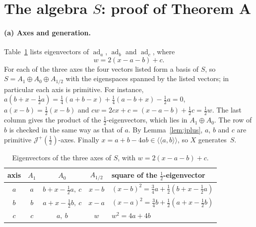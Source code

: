 \documentclass[11pt]{article}
\theoremstyle{definition}
\theoremstyle{remark}
\newcommand{\cJ}{\mathcal J}
\newcommand{\Jp}{\cJ^{+}}
\newcommand{\lla}{\langle\!\langle}
\newcommand{\rra}{\rangle\!\rangle}
\newcommand{\ad}{\operatorname{ad}}
\newcommand{\half}{\tfrac12}
\begin{document}
\section{The algebra \texorpdfstring{$S$}{S}: proof of Theorem A}\label{sec:S}

\paragraph{(a) Axes and generation.}
Table~\ref{tab:eig} lists eigenvectors of $\ad_a$, $\ad_b$ and $\ad_c$, where
\[
w=2(x-a-b)+c .
\]
For each of the three axes the four vectors listed form a basis of $S$, so
$S=A_1\oplus A_0\oplus A_{1/2}$ with the eigenspaces spanned by the listed
vectors; in particular each axis is primitive. For instance,
$a(b+x-\half a)=\frac14(a+b-x)+\frac14(a-b+x)-\half a=0$,
$a(x-b)=\half(x-b)$ and $cw=2cx+c=(x-a-b)+\half c=\half w$. The last column
gives the product of the $\half$-eigenvectors, which lies in $A_1\oplus A_0$.
The row of $b$ is checked in the same way as that of $a$. By
Lemma~\ref{lem:jplus}, $a$, $b$ and $c$ are primitive $\Jp(\half)$-axes.
Finally
$x=a+b-4ab\in\lla a,b\rra$, so $X$ generates~$S$.

\begin{table}[ht]\centering\small
\renewcommand{\arraystretch}{1.25}
\begin{tabular}{@{}ccccl@{}}\toprule
axis & $A_1$ & $A_0$ & $A_{1/2}$ & square of the $\half$-eigenvector\\\midrule
$a$ & $a$ & $b+x-\half a,\ c$ & $x-b$ &
 $(x-b)^2=\frac34a+\half(b+x-\half a)$\\
$b$ & $b$ & $a+x-\half b,\ c$ & $x-a$ &
 $(x-a)^2=\frac34b+\half(a+x-\half b)$\\
$c$ & $c$ & $a,\ b$ & $w$ & $w^2=4a+4b$\\\bottomrule
\end{tabular}
\caption{Eigenvectors of the three axes of $S$, with
$w=2(x-a-b)+c$.}\label{tab:eig}
\end{table}
\end{document}
